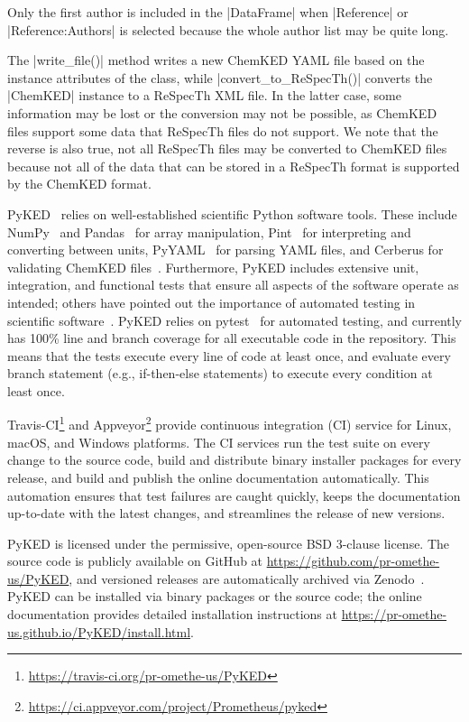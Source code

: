 \documentclass[12pt]{ijck}
\newcommand\ck{ChemKED}
\newcommand\pk{PyKED}
\begin{document}
Only the first author is included in the \pybox|DataFrame| when \pybox|Reference| or
\pybox|Reference:Authors| is selected because the whole author list may be
quite long.

The \pybox|write_file()| method writes a new \ck{} YAML file based on the instance attributes
of the class, while \pybox|convert_to_ReSpecTh()| converts the \pybox|ChemKED|
instance to a ReSpecTh XML file. In the latter case, some information may be lost or the conversion
may not be possible, as \ck{} files support some data that ReSpecTh files do not support. We note
that the reverse is also true, not all ReSpecTh files may be converted to \ck{} files because not
all of the data that can be stored in a ReSpecTh format is supported by the \ck{} format.

\pk{}~\autocite{PyKED} relies on well-established scientific Python software tools.
These include NumPy~\autocite{vanderWalt:2011np} and Pandas~\autocite{pandas,McKinney2010}
for array manipulation, Pint~\autocite{Grecco2016} for interpreting and converting
between units, PyYAML~\autocite{pyyaml} for parsing YAML
files, and Cerberus for validating \ck{} files~\autocite{cerberus}.
Furthermore, \pk{} includes extensive unit, integration, and functional tests
that ensure all aspects of the software operate as intended; others have pointed
out the importance of automated testing in scientific software~\autocite{Wilson:bestpractices}.
\pk{} relies on pytest~\autocite{pytest:3.0.1} for automated testing, and currently has
100\% line and branch coverage for all executable code in the repository. This
means that the tests execute every line of code at least once, and evaluate
every branch statement (e.g., if-then-else statements) to execute every condition
at least once.

Travis-CI\footnote{\url{https://travis-ci.org/pr-omethe-us/PyKED}} and
Appveyor\footnote{\url{https://ci.appveyor.com/project/Prometheus/pyked}} provide continuous
integration (CI) service for Linux, macOS, and Windows platforms. The CI services run the test suite
on every change to the source code, build and distribute binary installer packages for every
release, and build and publish the online documentation automatically. This automation ensures that
test failures are caught quickly, keeps the documentation up-to-date with the latest changes, and
streamlines the release of new versions.

\pk{} is licensed under the permissive, open-source BSD 3-clause license. The
source code is publicly available on GitHub at \url{https://github.com/pr-omethe-us/PyKED},
and versioned releases are automatically archived via Zenodo~\autocite{PyKED}.
\pk{} can be installed via binary packages or the source code; the online documentation
provides detailed installation instructions at
\url{https://pr-omethe-us.github.io/PyKED/install.html}.
\end{document}
